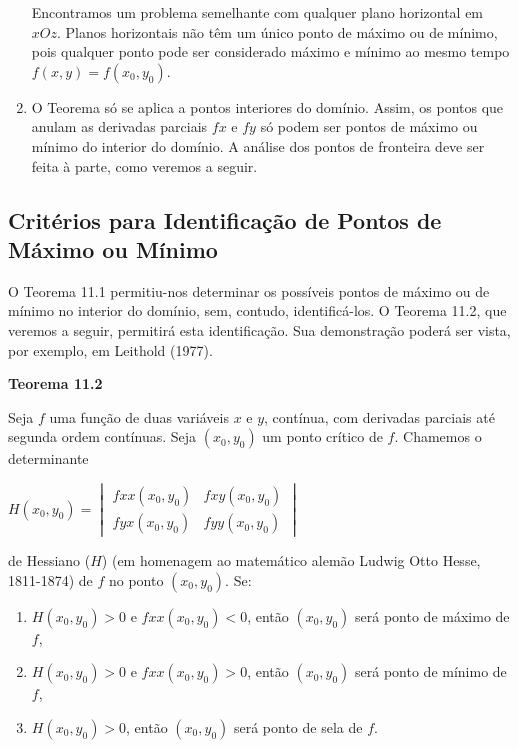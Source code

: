 \begin{enumerate}[label=(\roman*)]
			Encontramos um problema semelhante com qualquer plano horizontal em $xOz$. Planos horizontais não têm um único ponto de máximo ou de mínimo, pois qualquer ponto pode ser considerado máximo e mínimo ao mesmo tempo $f(x, y) = f (x_{0}, y_{0})$.

			\item O Teorema só se aplica a pontos interiores do domínio. Assim, os pontos que anulam as derivadas parciais $fx$ e $fy$ só podem ser pontos de máximo ou mínimo do interior do domínio. A análise dos pontos de fronteira deve ser feita à parte, como veremos a seguir.

		\end{enumerate}

	\subsection{Critérios para Identificação de Pontos de Máximo ou Mínimo \cite{morettin}}

		O Teorema 11.1 permitiu-nos determinar os possíveis pontos de máximo ou de mínimo no interior do domínio, sem, contudo, identificá-los. O Teorema 11.2, que veremos a seguir, permitirá esta identificação. Sua demonstração poderá ser vista, por exemplo, em Leithold (1977).

		\bigskip

		\textbf{Teorema 11.2} \cite{morettin}

		\medskip

		Seja $f$ uma função de duas variáveis $x$ e $y$, contínua, com derivadas parciais até segunda ordem contínuas. Seja $(x_{0}, y_{0})$ um ponto crítico de $f$. Chamemos o determinante

		\medskip

		$
		H(x_{0}, y_{0}) =
		\begin{vmatrix}

			fxx(x_{0}, y_{0}) & fxy(x_{0}, y_{0}) \\
			fyx(x_{0}, y_{0}) & fyy(x_{0}, y_{0})

		\end{vmatrix}
		$

		\medskip

		de Hessiano ($H$) (em homenagem ao matemático alemão Ludwig Otto Hesse, 1811-1874) de $f$ no ponto $(x_{0}, y_{0})$. Se:

		\begin{enumerate}[label=(\alph*)]

			\item $H(x_{0}, y_{0}) > 0$ e $fxx(x_{0}, y_{0}) < 0$, então $(x_{0}, y_{0})$ será ponto de máximo de $f$,

			\item $H(x_{0}, y_{0}) > 0$ e $fxx(x_{0}, y_{0}) > 0$, então $(x_{0}, y_{0})$ será ponto de mínimo de $f$,

			\item $H(x_{0}, y_{0}) > 0$, então $(x_{0}, y_{0})$ será ponto de sela de $f$.

		\end{enumerate}
		
